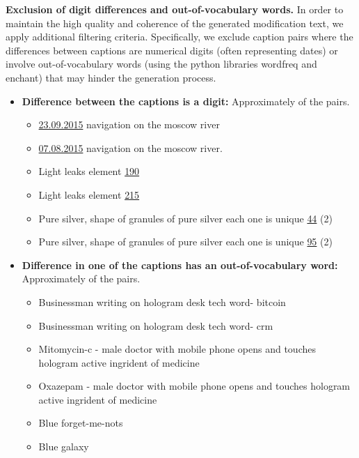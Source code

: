 \noindent\textbf{Exclusion of digit differences and out-of-vocabulary words.}
In order to maintain the high quality and coherence of the generated modification text, 
we apply additional filtering criteria. 
Specifically, we exclude caption pairs where the differences between captions 
are numerical digits (often representing dates) 
or involve out-of-vocabulary words (using the python libraries wordfreq and enchant) that may hinder the generation process.

\begin{itemize}
    \item \textbf{Difference between the captions is a digit:} Approximately  of the pairs. 
    \begin{itemize}
        \item \underline{23.09.2015} navigation on the moscow river
        \item \underline{07.08.2015} navigation on the moscow river.	
    \end{itemize}
    \begin{itemize}
        \item Light leaks element \underline{190}
        \item Light leaks element \underline{215}
    \end{itemize}
    \begin{itemize}
        \item Pure silver, shape of granules of pure silver each one is unique \underline{44} (2)
        \item Pure silver, shape of granules of pure silver each one is unique \underline{95} (2)
    \end{itemize}
   \item \textbf{Difference in one of the captions has an out-of-vocabulary word:} Approximately  of the pairs. 
    \begin{itemize}
        \item Businessman writing on hologram desk tech word- bitcoin
        \item Businessman writing on hologram desk tech word- crm
    \end{itemize}
    \begin{itemize}
        \item Mitomycin-c - male doctor with mobile phone opens and touches hologram active ingrident of medicine
        \item Oxazepam - male doctor with mobile phone opens and touches hologram active ingrident of medicine
    \end{itemize}
    \begin{itemize}
        \item Blue forget-me-nots
        \item Blue galaxy
    \end{itemize}
\end{itemize}


